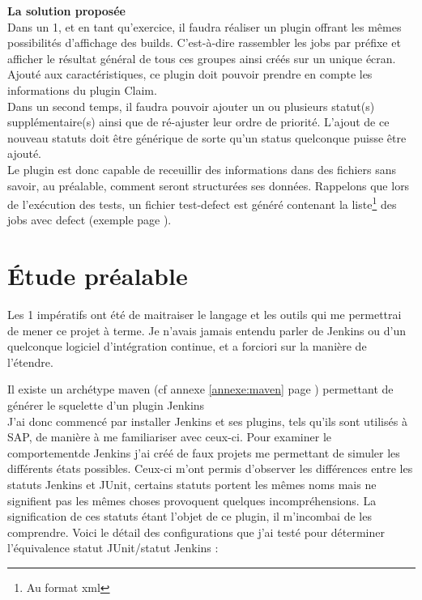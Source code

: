 \textbf{La solution propos\'{e}e}\hfill \\ \indent
Dans un 1, et en tant qu'exercice, il faudra réaliser un plugin offrant les mêmes possibilités d'affichage des builds. C'est-à-dire rassembler les jobs par préfixe et afficher le résultat général de tous ces groupes ainsi créés sur un unique écran. Ajouté aux caractéristiques, ce plugin doit pouvoir prendre en compte les informations du plugin Claim.\\ \indent
Dans un second temps, il faudra pouvoir ajouter un ou plusieurs statut(s) supplémentaire(s) ainsi que de ré-ajuster leur ordre de priorité. L'ajout de ce nouveau statuts doit être générique de sorte qu'un status quelconque puisse être ajouté.\\
Le plugin est donc capable de receuillir des informations dans des fichiers sans savoir, au préalable, comment seront structurées ses données. Rappelons que lors de l'exécution des tests, un fichier test-defect est généré contenant la liste\footnote{Au format xml} des jobs avec defect (exemple page \pageref{testdefectxml}).









\section{\'{E}tude préalable}
Les 1 impératifs ont été de maitraiser le langage et les outils qui me permettrai de mener ce projet à terme. Je n'avais jamais entendu parler de Jenkins ou d'un quelconque logiciel d'intégration continue, et a forciori sur la manière de l'étendre. 


Il existe un archétype maven (cf annexe \ref{annexe:maven} page \pageref{annexe:maven}) permettant de générer le squelette d'un plugin Jenkins\\

J'ai donc commencé par installer Jenkins et ses plugins, tels qu'ils sont utilisés à SAP, de manière à me familiariser avec ceux-ci. Pour examiner le comportementde Jenkins j'ai créé de faux projets me permettant de simuler les différents états possibles. Ceux-ci m'ont permis d'observer les différences entre les statuts Jenkins et JUnit, certains statuts portent les mêmes noms mais ne signifient pas les mêmes choses provoquent quelques incompréhensions. La signification de ces statuts étant l'objet de ce plugin, il m'incombai de les comprendre. Voici le détail des configurations que j'ai testé pour déterminer l'équivalence statut JUnit/statut Jenkins :

